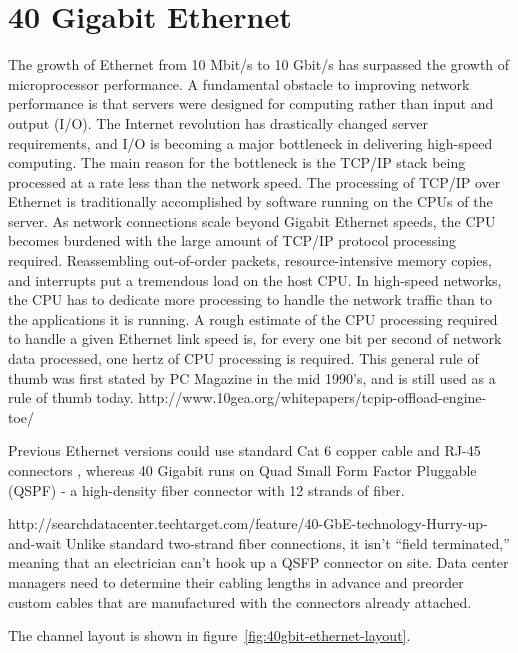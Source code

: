 
\chapter{40 Gigabit Ethernet}

The growth of Ethernet from 10 Mbit/s to 10 Gbit/s has surpassed the growth of microprocessor performance.
A fundamental obstacle to improving network performance is that servers were designed for computing rather than input and output (I/O).
The Internet revolution has drastically changed server requirements,
and I/O is becoming a major bottleneck in delivering high-speed computing.
The main reason for the bottleneck is the TCP/IP stack being processed at a rate less than the network speed.
The processing of TCP/IP over Ethernet is traditionally accomplished by software running on the CPUs of the server.
As network connections scale beyond Gigabit Ethernet speeds,
the CPU becomes burdened with the large amount of TCP/IP protocol processing required.
Reassembling out-of-order packets, resource-intensive memory copies, and interrupts put a tremendous load on the host CPU.
In high-speed networks, the CPU has to dedicate more processing to handle the network traffic than to the applications it is running.
A rough estimate of the CPU processing required to handle a given Ethernet link speed is,
for every one bit per second of network data processed, one hertz of CPU processing is required.
This general rule of thumb was first stated by PC Magazine in the mid 1990’s, and is still used as a rule of thumb today.
http://www.10gea.org/whitepapers/tcpip-offload-engine-toe/




Previous Ethernet versions could use standard Cat 6 copper cable and RJ-45 connectors , %
whereas 40 Gigabit runs on Quad Small Form Factor Pluggable (QSPF) - a high-density fiber connector with 12 strands of fiber.

http://searchdatacenter.techtarget.com/feature/40-GbE-technology-Hurry-up-and-wait
Unlike standard two-strand fiber connections, it isn’t “field terminated,” meaning that an electrician can’t hook up a QSFP connector on site. Data center managers need to determine their cabling lengths in advance and preorder custom cables that are manufactured with the connectors already attached.


The channel layout is shown in figure~\ref{fig:40gbit-ethernet-layout}.

